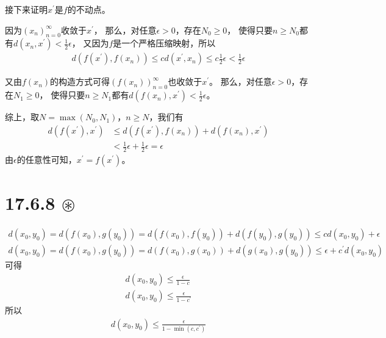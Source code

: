 \documentclass{article}
\begin{document}
\begin{itemize}
        接下来证明$x^\prime$是$f$的不动点。

        因为$(x_n)_{n = 0}^\infty$收敛于$x^\prime$，
        那么，对任意$\epsilon > 0$，存在$N_0 \geq 0$，
        使得只要$n \geq N_0$都有$d(x_n, x^\prime) < \frac{1}{2}\epsilon$，
        又因为$f$是一个严格压缩映射，所以
        \begin{align*}
          d(f(x^\prime), f(x_n)) \leq c d(x^\prime, x_n) \leq  c \frac{1}{2} \epsilon < \frac{1}{2} \epsilon
        \end{align*}

        又由$f(x_n)$的构造方式可得$(f(x_n))_{n = 0}^\infty$也收敛于$x^\prime$。
        那么，对任意$\epsilon > 0$，存在$N_1 \geq 0$，
        使得只要$n \geq N_1$都有$d(f(x_n), x^\prime) < \frac{1}{2}\epsilon$。

        综上，取$N = \max(N_0, N_1)$，$n \geq N$，我们有
        \begin{align*}
          d(f(x^\prime), x^\prime)
           & \leq d(f(x^\prime), f(x_n)) + d(f(x_n), x^\prime)      \\
           & < \frac{1}{2}\epsilon + \frac{1}{2}\epsilon = \epsilon
        \end{align*}
        由$\epsilon$的任意性可知，$x^\prime = f(x^\prime)$。
\end{itemize}

\section*{17.6.8 $\circledast$}
\begin{align*}
  d(x_0, y_0) = d(f(x_0), g(y_0)) = d(f(x_0), f(y_0)) + d(f(y_0), g(y_0)) \leq cd(x_0, y_0) + \epsilon \\
  d(x_0, y_0) = d(f(x_0), g(y_0)) = d(f(x_0), g(x_0)) + d(g(x_0), g(y_0)) \leq \epsilon + c^\prime d(x_0, y_0)
\end{align*}
可得
\begin{align*}
  d(x_0, y_0) \leq \frac{\epsilon}{1 - c} \\
  d(x_0, y_0) \leq \frac{\epsilon}{1 - c^\prime}
\end{align*}
所以
\begin{align*}
  d(x_0, y_0) \leq \frac{\epsilon}{1 - \min(c, c^\prime)}
\end{align*}
\end{document}
